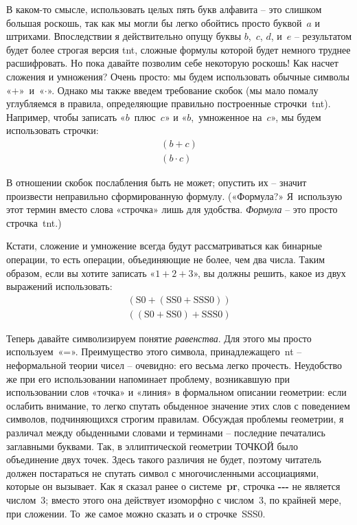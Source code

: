 \documentclass[../main.tex]{subfiles}
\begin{document}
В каком-то смысле, использовать целых пять букв алфавита \--- это слишком большая роскошь, так как мы могли бы легко обойтись просто буквой~$a$ и штрихами. Впоследствии я действительно опущу буквы $b$,~$c$, $d$, и~$e$ \--- результатом будет более строгая версия \acs{tnt}, сложные формулы которой будет немного труднее расшифровать. Но пока давайте позволим себе некоторую роскошь! Как насчет сложения и умножения? Очень просто: мы будем использовать обычные символы «$+$»~и~«$\cdot$». Однако мы также введем требование скобок (мы мало помалу углубляемся в правила, определяющие правильно построенные строчки~\acs{tnt}). Например, чтобы записать «$b$~плюс~$c$» и «$b$,~умноженное на~$c$», мы будем использовать строчки:
\begin{gather*}
    (b + c) \\
    (b \cdot c)
\end{gather*}

В отношении скобок послабления быть не может; опустить их \--- значит произвести неправильно сформированную формулу. («Формула?» Я~использую этот термин вместо слова «строчка» лишь для удобства. \emph{Формула} \--- это просто строчка~\acs{tnt}.)

Кстати, сложение и умножение всегда будут рассматриваться как бинарные операции, то есть операции, объединяющие не более, чем два числа. Таким образом, если вы хотите записать «$1 + 2 + 3$», вы должны решить, какое из двух выражений использовать:
\begin{gather*}
    \mathrm{(S0+(SS0+SSS0))} \\
    \mathrm{((S0+SS0)+SSS0)}
\end{gather*}

Теперь давайте символизируем понятие \emph{равенства}. Для этого мы просто используем~«=». Преимущество этого символа, принадлежащего~\acs{nt} \--- неформальной теории чисел \--- очевидно: его весьма легко прочесть. Неудобство же при его использовании напоминает проблему, возникавшую при использовании слов «точка» и «линия» в формальном описании геометрии: если ослабить внимание, то легко спутать обыденное значение этих слов с поведением символов, подчиняющихся строгим правилам. Обсуждая проблемы геометрии, я различал между обыденными словами и терминами \--- последние печатались заглавными буквами. Так, в эллиптической геометрии ТОЧКОЙ было объединение двух точек. Здесь такого различия не будет, поэтому читатель должен постараться не спутать символ с многочисленными ассоциациями, которые он вызывает. Как я сказал ранее о системе~\textbf{pr}, строчка \textbf{-{}-{}-} не является числом~3; вместо этого она действует изоморфно с числом~3, по крайней мере, при сложении. То~же самое можно сказать и о строчке~SSS0.
\end{document}
